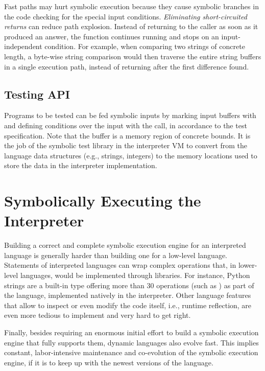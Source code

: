 Fast paths may hurt symbolic execution because they cause symbolic branches in the code checking for the special input conditions.  \emph{Eliminating short-circuited returns} can reduce path explosion.  Instead of returning to the caller as soon as it produced an answer, the function continues running and stops on an input-independent condition.  For example, when comparing two strings of concrete length, a byte-wise string comparison would then traverse the entire string buffers in a single execution path, instead of returning after the first difference found.

\subsection{Testing API}
\label{sec:chef:testingAPI}

Programs to be tested can be fed symbolic inputs by marking input buffers with  and defining conditions over the input with the  call, in accordance to the test specification.  Note that the buffer is a memory region of concrete bounds.  It is the job of the symbolic test library in the interpreter VM to convert from the language data structures (e.g., strings, integers) to the memory locations used to store the data in the interpreter implementation.



\iffalse
\section{Symbolically Executing the Interpreter}

Building a correct and complete symbolic execution engine for an interpreted language is generally harder than building one for a low-level language. 
%
Statements of interpreted languages can wrap complex operations that, in lower-level languages, would be implemented through libraries. For instance, Python strings are a built-in type offering more than 30 operations (such as ) as part of the language, implemented natively in the interpreter. 
%
Other language features that allow to inspect or even modify the code itself, i.e., runtime reflection, are even more tedious to implement and very hard to get right.

Finally, besides requiring an enormous initial effort to build a symbolic execution engine that fully supports them, dynamic languages also evolve fast. This implies constant, labor-intensive maintenance and co-evolution of the symbolic execution engine, if it is to keep up with the newest versions of the language.

